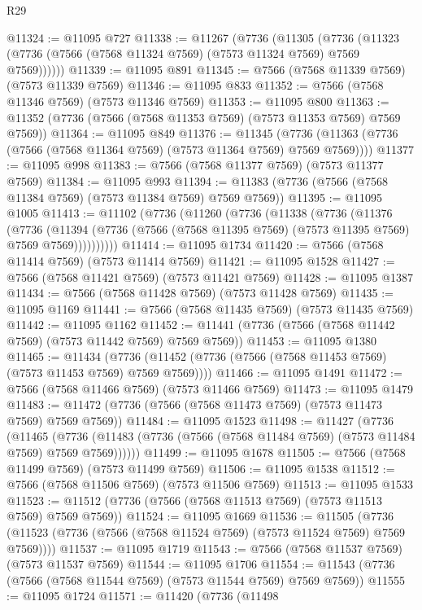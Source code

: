 \begin{lexlean}{R29}
\begin{coremodule}
@11324 := @11095 @727
@11338 := @11267
    (@7736
      (@11305
        (@7736 (@11323 (@7736 (@7566 (@7568 @11324 @7569) (@7573 @11324 @7569) @7569 @7569))))))
@11339 := @11095 @891
@11345 := @7566 (@7568 @11339 @7569) (@7573 @11339 @7569)
@11346 := @11095 @833
@11352 := @7566 (@7568 @11346 @7569) (@7573 @11346 @7569)
@11353 := @11095 @800
@11363 := @11352 (@7736 (@7566 (@7568 @11353 @7569) (@7573 @11353 @7569) @7569 @7569))
@11364 := @11095 @849
@11376 := @11345
    (@7736 (@11363 (@7736 (@7566 (@7568 @11364 @7569) (@7573 @11364 @7569) @7569 @7569))))
@11377 := @11095 @998
@11383 := @7566 (@7568 @11377 @7569) (@7573 @11377 @7569)
@11384 := @11095 @993
@11394 := @11383 (@7736 (@7566 (@7568 @11384 @7569) (@7573 @11384 @7569) @7569 @7569))
@11395 := @11095 @1005
@11413 := @11102
    (@7736
      (@11260
        (@7736
          (@11338
            (@7736
              (@11376
                (@7736
                  (@11394
                    (@7736 (@7566 (@7568 @11395 @7569) (@7573 @11395 @7569) @7569 @7569))))))))))
@11414 := @11095 @1734
@11420 := @7566 (@7568 @11414 @7569) (@7573 @11414 @7569)
@11421 := @11095 @1528
@11427 := @7566 (@7568 @11421 @7569) (@7573 @11421 @7569)
@11428 := @11095 @1387
@11434 := @7566 (@7568 @11428 @7569) (@7573 @11428 @7569)
@11435 := @11095 @1169
@11441 := @7566 (@7568 @11435 @7569) (@7573 @11435 @7569)
@11442 := @11095 @1162
@11452 := @11441 (@7736 (@7566 (@7568 @11442 @7569) (@7573 @11442 @7569) @7569 @7569))
@11453 := @11095 @1380
@11465 := @11434
    (@7736 (@11452 (@7736 (@7566 (@7568 @11453 @7569) (@7573 @11453 @7569) @7569 @7569))))
@11466 := @11095 @1491
@11472 := @7566 (@7568 @11466 @7569) (@7573 @11466 @7569)
@11473 := @11095 @1479
@11483 := @11472 (@7736 (@7566 (@7568 @11473 @7569) (@7573 @11473 @7569) @7569 @7569))
@11484 := @11095 @1523
@11498 := @11427
    (@7736
      (@11465
        (@7736 (@11483 (@7736 (@7566 (@7568 @11484 @7569) (@7573 @11484 @7569) @7569 @7569))))))
@11499 := @11095 @1678
@11505 := @7566 (@7568 @11499 @7569) (@7573 @11499 @7569)
@11506 := @11095 @1538
@11512 := @7566 (@7568 @11506 @7569) (@7573 @11506 @7569)
@11513 := @11095 @1533
@11523 := @11512 (@7736 (@7566 (@7568 @11513 @7569) (@7573 @11513 @7569) @7569 @7569))
@11524 := @11095 @1669
@11536 := @11505
    (@7736 (@11523 (@7736 (@7566 (@7568 @11524 @7569) (@7573 @11524 @7569) @7569 @7569))))
@11537 := @11095 @1719
@11543 := @7566 (@7568 @11537 @7569) (@7573 @11537 @7569)
@11544 := @11095 @1706
@11554 := @11543 (@7736 (@7566 (@7568 @11544 @7569) (@7573 @11544 @7569) @7569 @7569))
@11555 := @11095 @1724
@11571 := @11420
    (@7736
      (@11498

\end{coremodule}
\end{lexlean}

